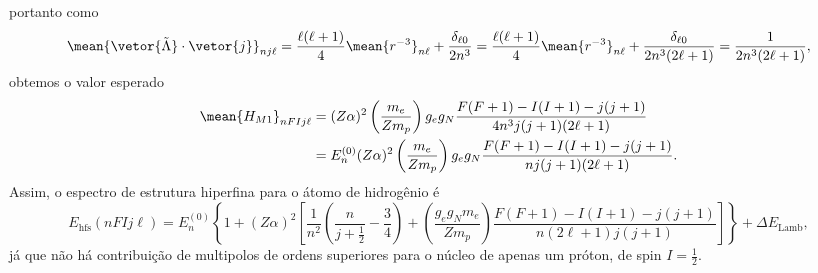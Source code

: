 portanto como
\begin{equation*}
   \mean{\vetor{\tilde{\Lambda}}\cdot\vetor{j}}_{nj\ell} = \frac{\ell(\ell + 1)}{4}\mean{r^{-3}}_{n\ell} + \frac{\delta_{\ell 0}}{2n^3} = \frac{\ell(\ell + 1)}{4}\mean{r^{-3}}_{n\ell} + \frac{\delta_{\ell 0}}{2n^3(2\ell + 1)} = \frac{1}{2n^3(2\ell + 1)},
\end{equation*}
obtemos o valor esperado
\begin{align*}
   \mean{H_{M1}}_{nFIj \ell} &= (Z \alpha)^2\left(\frac{m_e}{Z m_p}\right)g_e g_N \frac{F(F+1) - I(I+1) - j(j+1)}{4n^3j(j+1)(2\ell+1)}\\
                             &= E^{(0)}_n (Z \alpha)^2\left(\frac{m_e}{Zm_p}\right)g_eg_N\frac{F(F+1) - I(I+1) - j(j+1)}{n j(j+1)(2\ell+1)}.
\end{align*}
Assim, o espectro de estrutura hiperfina para o átomo de hidrogênio é
\begin{equation*}
   E_{\mathrm{hfs}}(nFIj\ell) = E_{n}^{(0)}\left\{1 + (Z \alpha)^2 \left[\frac{1}{n^2}\left(\frac{n}{j + \frac12} - \frac34\right) + \left(\frac{g_e g_N m_e}{Z m_p}\right)\frac{F(F+1) - I(I+1) - j(j+1)}{n(2\ell + 1) j(j+1)}\right]\right\} + \Delta E_{\mathrm{Lamb}},
\end{equation*}
já que não há contribuição de multipolos de ordens superiores para o núcleo de apenas um próton, de spin \(I = \frac12.\)

